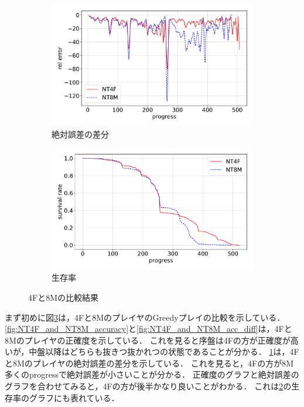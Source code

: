\begin{figure}[t]
\begin{subfigure}[b]{0.49\linewidth}
    \includegraphics[width=\linewidth]{pdf/compare/NT4F_and_NT8M/error_abs.pdf}
    \caption{絶対誤差の差分}
    \label{fig:NT4F_and_NT8M_error_abs_diff}
\end{subfigure}
\begin{subfigure}[b]{0.49\linewidth}
    \includegraphics[width=\linewidth]{pdf/compare/NT4F_and_NT8M/survival.pdf}
    \caption{生存率}
    \label{fig:NT4F_and_NT8M_survival}
\end{subfigure}
\caption{4Fと8Mの比較結果}
\label{fig:NT4F_and_NT8M_results}
\end{figure}

まず初めに図\ref{fig:NT4F_and_NT8M_results}は，4Fと8MのプレイヤのGreedyプレイの比較を示している．
\ref{fig:NT4F_and_NT8M_accuracy}と\ref{fig:NT4F_and_NT8M_acc_diff}は，4Fと8Mのプレイヤの正確度を示している．
これを見ると序盤は4Fの方が正確度が高いが，中盤以降はどちらも抜きつ抜かれつの状態であることが分かる．
\ref{fig:NT4F_and_NT8M_error_abs_diff}は，4Fと8Mのプレイヤの絶対誤差の差分を示している．
これを見ると，4Fの方が8M多くのprogressで絶対誤差が小さいことが分かる．
正確度のグラフと絶対誤差のグラフを合わせてみると，4Fの方が後半かなり良いことがわかる．
これは\ref{fig:NT4F_and_NT8M_survival}の生存率のグラフにも表れている．


